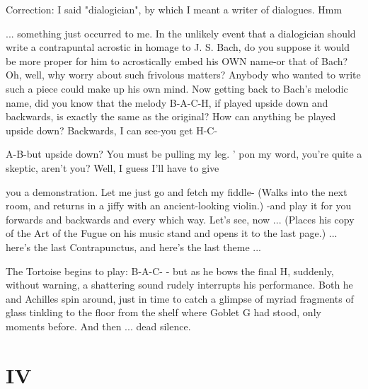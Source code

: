\tortoise Correction: I said "dialogician", by which I meant a writer of dialogues. Hmm\par
... something just occurred to me. In the unlikely event that a dialogician should write a contrapuntal acrostic in homage to J. S. Bach, do you suppose it would be more proper for him to acrostically embed his OWN name-or that of Bach? Oh, well, why worry about such frivolous matters? Anybody who wanted to write such a piece could make up his own mind. Now getting back to Bach's melodic name, did you know that the melody B-A-C-H, if played upside down and backwards, is exactly the same as the original? 
\achilles How can anything be played upside down? Backwards, I can see-you get H-C-\par
A-B-but upside down? You must be pulling my leg. 
\tortoise ' pon my word, you're quite a skeptic, aren't you? Well, I guess I'll have to give\par
you a demonstration. Let me just go and fetch my fiddle- (Walks into the next room, and returns in a jiffy with an ancient-looking violin.) -and play it for you forwards and backwards and every which way. Let's see, now ... (Places his copy of the Art of the Fugue on his music stand and opens it to the last page.) ... here's the last Contrapunctus, and here's the last theme ... 

The Tortoise begins to play: B-A-C- - but as he bows the final H, suddenly, without warning, a shattering sound rudely interrupts his performance. Both he and Achilles spin around, just in time to catch a glimpse of myriad fragments of glass tinkling to the floor from the shelf where Goblet G had stood, only moments before. And then ... dead silence. 








\chapter {IV}


